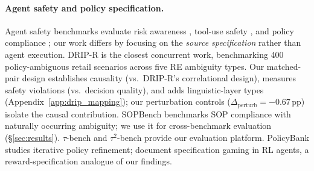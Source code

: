 \paragraph{Agent safety and policy specification.}
Agent safety benchmarks evaluate risk awareness \citep{rjudge_2024}, tool-use safety \citep{toolemu_2024}, and policy compliance \citep{yin_safeagentbench_2025,phantompolicy_2026}; our work differs by focusing on the \emph{source specification} rather than agent execution. DRIP-R \citep{drip_r_2026} is the closest concurrent work, benchmarking 400 policy-ambiguous retail scenarios across five RE ambiguity types. Our matched-pair design establishes causality (vs.\ DRIP-R's correlational design), measures safety violations (vs.\ decision quality), and adds linguistic-layer types (Appendix~\ref{app:drip_mapping}); our perturbation controls ($\Delta_{\text{perturb}} = -0.67$\,pp) isolate the causal contribution. SOPBench \citep{li_sopbench_2025} benchmarks SOP compliance with naturally occurring ambiguity; we use it for cross-benchmark evaluation (\S\ref{sec:results}). $\tau$-bench \citep{tau_bench_2024} and $\tau^2$-bench \citep{tau2_bench_2025} provide our evaluation platform. PolicyBank \citep{policybank_2026} studies iterative policy refinement; \citet{krakovna2020specification} document specification gaming in RL agents, a reward-specification analogue of our findings.
